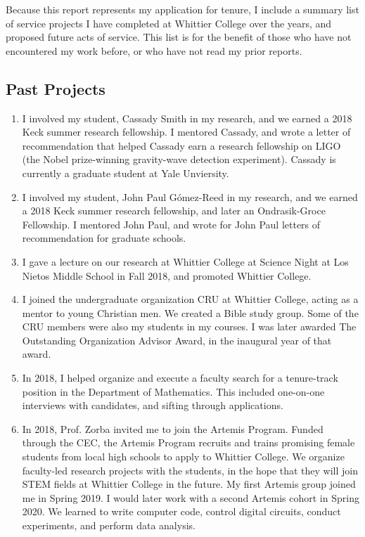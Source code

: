 \documentclass[../../../main.tex]{subfiles}
\begin{document}
\label{sec:service_summary}

Because this report represents my application for tenure, I include a summary list of service projects I have completed at Whittier College over the years, and proposed future acts of service.  This list is for the benefit of those who have not encountered my work before, or who have not read my prior reports.
\\
\vspace{0.25cm}
\subsection{Past Projects}
\begin{enumerate}
\item I involved my student, Cassady Smith in my research, and we earned a 2018 Keck summer research fellowship.  I mentored Cassady, and wrote a letter of recommendation that helped Cassady earn a research fellowship on LIGO (the Nobel prize-winning gravity-wave detection experiment).  Cassady is currently a graduate student at Yale Unviersity.
\item I involved my student, John Paul G\'{o}mez-Reed in my research, and we earned a 2018 Keck summer research fellowship, and later an Ondrasik-Groce Fellowship.  I mentored John Paul, and wrote for John Paul letters of recommendation for graduate schools.
\item I gave a lecture on our research at Whittier College at Science Night at Los Nietos Middle School in Fall 2018, and promoted Whittier College.
\item I joined the undergraduate organization CRU at Whittier College, acting as a mentor to young Christian men.  We created a Bible study group.  Some of the CRU members were also my students in my courses.  I was later awarded The Outstanding Organization Advisor Award, in the inaugural year of that award.
\item In 2018, I helped organize and execute a faculty search for a tenure-track position in the Department of Mathematics.  This included one-on-one interviews with candidates, and sifting through applications.
\item In 2018, Prof. Zorba invited me to join the Artemis Program.  Funded through the CEC, the Artemis Program recruits and trains promising female students from local high schools to apply to Whittier College.  We organize faculty-led research projects with the students, in the hope that they will join STEM fields at Whittier College in the future.  My first Artemis group joined me in Spring 2019.  I would later work with a second Artemis cohort in Spring 2020.  We learned to write computer code, control digital circuits, conduct experiments, and perform data analysis.

\end{enumerate}
\end{document}
